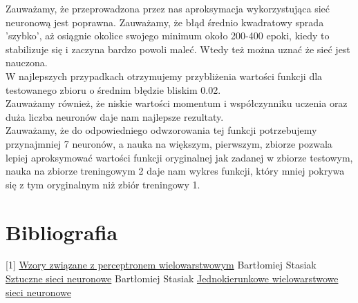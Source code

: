 \documentclass[12pt]{article}
\begin{document}
Zauważamy, że przeprowadzona przez nas aproksymacja wykorzystująca sieć neuronową jest poprawna. Zauważamy, że  błąd średnio kwadratowy sprada 'szybko', aż osiągnie okolice swojego minimum około 200-400 epoki, kiedy to stabilizuje się i zaczyna bardzo powoli maleć. Wtedy też można uznać że sieć jest nauczona.\\W najlepszych przypadkach otrzymujemy przybliżenia wartości funkcji dla testowanego zbioru o średnim błędzie bliskim 0.02. \\ Zauważamy również, że niskie wartości momentum i współczynniku uczenia oraz duża liczba neuronów daje nam najlepsze rezultaty.\\ Zauważamy, że do odpowiedniego odwzorowania tej funkcji potrzebujemy przynajmniej 7 neuronów, a nauka na większym, pierwszym, zbiorze pozwala lepiej aproksymować wartości funkcji oryginalnej jak zadanej w zbiorze testowym, nauka na zbiorze treningowym 2 daje nam wykres funkcji, który mniej pokrywa się z tym oryginalnym niż zbiór treningowy 1.\\ 

\section {Bibliografia}
[1] \href{https://ftims.edu.p.lodz.pl/pluginfile.php/137799/mod_resource/content/7/perceptron.pdf}{Wzory związane z perceptronem wielowarstwowym}
\newline
[2] Bartłomiej Stasiak \href{https://ftims.edu.p.lodz.pl/pluginfile.php/137980/mod_resource/content/1/3.pdf}{Sztuczne sieci neuronowe}
\newline
[3] Bartłomiej Stasiak \href{https://ftims.edu.p.lodz.pl/pluginfile.php/137981/mod_resource/content/2/4.pdf}{Jednokierunkowe wielowarstwowe sieci neuronowe}







\renewcommand\refname{Bibliografia}


\end{document}
